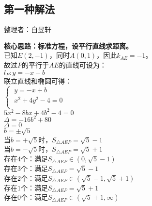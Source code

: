 \documentclass[UTF8]{ctexart}
\begin{document}
\newpage

\subsection{第一种解法}
    \begin{center}
        整理者：白昱轩
    \end{center}
    \begin{multicols}{2}
        \small
        \textbf{核心思路：标准方程，设平行直线求距离。}\\[5mm]
        已知$E(2,-1)$，同时$A(0,1)$，因此$k_{AE}=-1$。\\[5mm]
        故过$P$的平行于$AE$的直线可设为：\\[5mm]
        $l_P:y=-x+b$\\[5mm]
        联立直线和椭圆可得：\\[5mm]
        \begin{math}
            \begin{cases}
                ~y=-x+b\\[1mm]
                ~x^2+4y^2-4=0\\[1mm]
            \end{cases}
        \end{math}\\[5mm]
        $5x^2-8bx+4b^2-4=0$\\[5mm]
        $\Delta=-16b^2+80$\\[5mm]
        $\Delta=0 $\\[5mm]
        $ b = \pm \sqrt{5}$\\[5mm]
        当$b = +\sqrt{5}$时，$S_{\triangle AEP}= \sqrt{5}-1$\\[5mm]
        当$b = -\sqrt{5}$时，$S_{\triangle AEP}= \sqrt{5}+1$\\[5mm]
        存在$4$个：满足$S_{\triangle AEP} \in \left(0,\sqrt{5}-1\right)$\\[5mm]
        存在$3$个：满足$S_{\triangle AEP} = \sqrt{5}-1$\\[5mm]
        存在$2$个：满足$S_{\triangle AEP} \in \left(\sqrt{5}-1,\sqrt{5}+1\right)$\\[5mm]
        存在$1$个：满足$S_{\triangle AEP}= \sqrt{5}+1$\\[5mm]
        存在$0$个：满足$S_{\triangle AEP} \in \left(\sqrt{5}+1,\infty \right)$\\[50mm]
        \newpage
    \end{multicols}

\newpage
\end{document}
